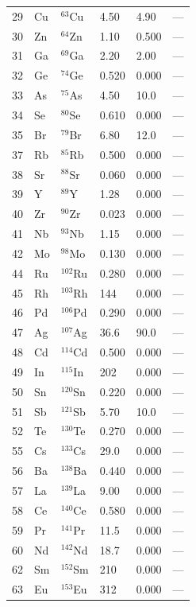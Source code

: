 \documentclass[11pt,a4paper]{article}
\theoremstyle{remark}
\begin{document}
\begin{longtable}{p{0.8cm}p{1.2cm}p{2.0cm}p{2.5cm}p{2.5cm}p{2.5cm}}
		29 & Cu & \(^{63}\)Cu & 4.50 & 4.90 & --- \\
		30 & Zn & \(^{64}\)Zn & 1.10 & 0.500 & --- \\
		31 & Ga & \(^{69}\)Ga & 2.20 & 2.00 & --- \\
		32 & Ge & \(^{74}\)Ge & 0.520 & 0.000 & --- \\
		33 & As & \(^{75}\)As & 4.50 & 10.0 & --- \\
		34 & Se & \(^{80}\)Se & 0.610 & 0.000 & --- \\
		35 & Br & \(^{79}\)Br & 6.80 & 12.0 & --- \\
		37 & Rb & \(^{85}\)Rb & 0.500 & 0.000 & --- \\
		38 & Sr & \(^{88}\)Sr & 0.060 & 0.000 & --- \\
		39 & Y  & \(^{89}\)Y & 1.28 & 0.000 & --- \\
		40 & Zr & \(^{90}\)Zr & 0.023 & 0.000 & --- \\
		41 & Nb & \(^{93}\)Nb & 1.15 & 0.000 & --- \\
		42 & Mo & \(^{98}\)Mo & 0.130 & 0.000 & --- \\
		44 & Ru & \(^{102}\)Ru & 0.280 & 0.000 & --- \\
		45 & Rh & \(^{103}\)Rh & 144 & 0.000 & --- \\
		46 & Pd & \(^{106}\)Pd & 0.290 & 0.000 & --- \\
		47 & Ag & \(^{107}\)Ag & 36.6 & 90.0 & --- \\
		48 & Cd & \(^{114}\)Cd & 0.500 & 0.000 & --- \\
		49 & In & \(^{115}\)In & 202 & 0.000 & --- \\
		50 & Sn & \(^{120}\)Sn & 0.220 & 0.000 & --- \\
		51 & Sb & \(^{121}\)Sb & 5.70 & 10.0 & --- \\
		52 & Te & \(^{130}\)Te & 0.270 & 0.000 & --- \\
		55 & Cs & \(^{133}\)Cs & 29.0 & 0.000 & --- \\
		56 & Ba & \(^{138}\)Ba & 0.440 & 0.000 & --- \\
		57 & La & \(^{139}\)La & 9.00 & 0.000 & --- \\
		58 & Ce & \(^{140}\)Ce & 0.580 & 0.000 & --- \\
		59 & Pr & \(^{141}\)Pr & 11.5 & 0.000 & --- \\
		60 & Nd & \(^{142}\)Nd & 18.7 & 0.000 & --- \\
		62 & Sm & \(^{152}\)Sm & 210 & 0.000 & --- \\
		63 & Eu & \(^{153}\)Eu & 312 & 0.000 & --- \\

\end{longtable}
\end{document}
